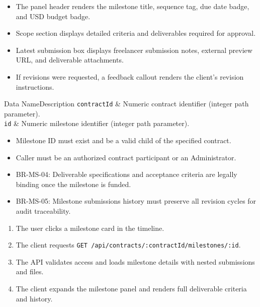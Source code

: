 \begin{itemize}[leftmargin=1.6em,topsep=3pt,itemsep=2pt,parsep=0pt,label=$\bullet$]
      \item The panel header renders the milestone title, sequence tag, due date badge, and USD budget badge.
      \item Scope section displays detailed criteria and deliverables required for approval.
      \item Latest submission box displays freelancer submission notes, external preview URL, and deliverable attachments.
      \item If revisions were requested, a feedback callout renders the client's revision instructions.
\end{itemize}


\begin{specdatatable}{Data Name}{Description}
      \texttt{contractId} & Numeric contract identifier (integer path parameter).\\ \hline
      \texttt{id} & Numeric milestone identifier (integer path parameter).\\ \hline
\end{specdatatable}

\begin{itemize}[leftmargin=1.6em,topsep=3pt,itemsep=2pt,parsep=0pt,label=$\bullet$]
      \item Milestone ID must exist and be a valid child of the specified contract.
      \item Caller must be an authorized contract participant or an Administrator.
\end{itemize}

\begin{itemize}[leftmargin=1.6em,topsep=3pt,itemsep=2pt,parsep=0pt,label=$\bullet$]\brrulelist
      \item BR-MS-04: Deliverable specifications and acceptance criteria are legally binding once the milestone is funded.
      \item BR-MS-05: Milestone submissions history must preserve all revision cycles for audit traceability.
\end{itemize}

\begin{enumerate}[leftmargin=1.8em,topsep=3pt,itemsep=2pt,parsep=0pt]
      \item The user clicks a milestone card in the timeline.
      \item The client requests \texttt{GET /api/contracts/:contractId/milestones/:id}.
      \item The API validates access and loads milestone details with nested submissions and files.
      \item The client expands the milestone panel and renders full deliverable criteria and history.
\end{enumerate}

